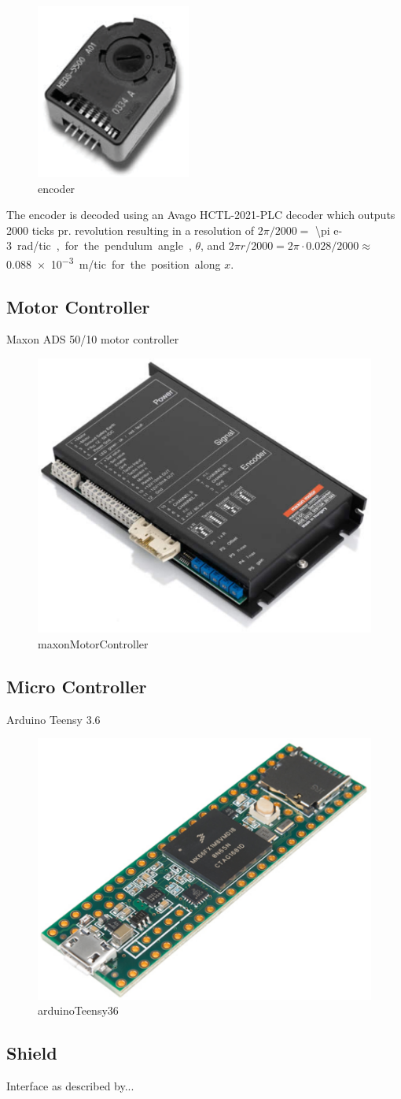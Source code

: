 
\begin{figure}[H]
  \includegraphics[width=.16\textwidth]{figures/infineonEncoderHEDS5540-A14}
  \caption{encoder}
  \label{fig:encoder}
\end{figure}

The encoder is decoded using an Avago HCTL-2021-PLC decoder which outputs 2000 ticks pr. revolution resulting in a resolution of $2\pi/2000=$ \SI{\pi e-3} rad/tic, for the pendulum angle, $\theta$, and $2\pi r /2000=2\pi\cdot 0.028 /2000\approx$ \SI{0.088e-3} m/tic for the position along $x$.

\subsection{Motor Controller}

Maxon ADS 50/10 motor controller


\begin{figure}[H]
  \includegraphics[width=.26\textwidth]{figures/maxonMotorController}
  \caption{maxonMotorController}
  \label{fig:maxonMotorController}
\end{figure}

\subsection{Micro Controller}

Arduino Teensy 3.6


\begin{figure}[H]
  \includegraphics[width=.2\textwidth]{figures/arduinoTeensy36}
  \caption{arduinoTeensy36}
  \label{fig:arduinoTeensy36}
\end{figure}

\subsection{Shield}
Interface as described by... 
